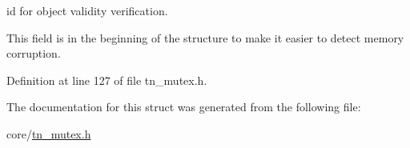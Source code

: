 id for object validity verification. 

This field is in the beginning of the structure to make it easier to detect memory corruption. 

Definition at line 127 of file tn\+\_\+mutex.\+h.



The documentation for this struct was generated from the following file\+:\begin{DoxyCompactItemize}
\item 
core/\hyperlink{tn__mutex_8h}{tn\+\_\+mutex.\+h}\end{DoxyCompactItemize}
